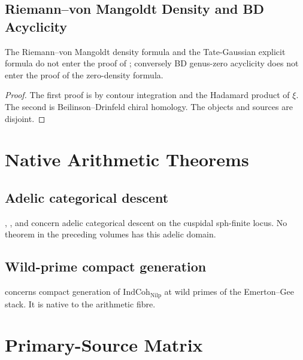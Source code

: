 \subsection{Riemann--von Mangoldt Density and BD Acyclicity}
\label{v4-arith:w6-i:W5-I-alignment}

\begin{theorem}
\label{v4-arith:w6-i:thm:W5-I-orthogonal}
The Riemann--von Mangoldt density formula and the Tate-Gaussian
explicit formula do not enter the proof of
; conversely BD genus-zero acyclicity
does not enter the proof of the zero-density formula.
\end{theorem}

\begin{proof}
The first proof is by contour integration and the Hadamard product of
\(\xi\).  The second is Beilinson--Drinfeld chiral homology.  The
objects and sources are disjoint.
\end{proof}

\section{Native Arithmetic Theorems}
\label{v4-arith:w6-i:orthogonals}

\subsection{Adelic categorical descent}

,
, and
 concern adelic categorical
descent on the cuspidal sph-finite locus.  No theorem in the
preceding volumes has this adelic domain.

\subsection{Wild-prime compact generation}

 concerns compact generation of
\(\mathrm{IndCoh}_{\mathrm{Nilp}}\) at wild primes of the
Emerton--Gee stack.  It is native to the arithmetic fibre.

\section{Primary-Source Matrix}
\label{v4-arith:w6-i:disjointness-table}

